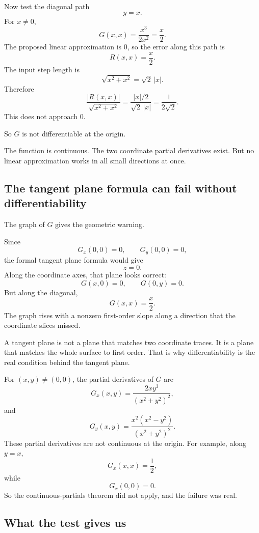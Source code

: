 Now test the diagonal path
\[
    y=x.
\]
For \(x\ne0\),
\[
    G(x,x)=
    \frac{x^3}{2x^2}
    =
    \frac{x}{2}.
\]
The proposed linear approximation is \(0\), so the error along this path is
\[
    R(x,x)=\frac{x}{2}.
\]
The input step length is
\[
    \sqrt{x^2+x^2}=\sqrt2\,|x|.
\]
Therefore
\[
    \frac{|R(x,x)|}{\sqrt{x^2+x^2}}
    =
    \frac{|x|/2}{\sqrt2\,|x|}
    =
    \frac1{2\sqrt2}.
\]
This does not approach \(0\).

So \(G\) is not differentiable at the origin.

The function is continuous.  The two coordinate partial derivatives exist.  But no
linear approximation works in all small directions at once.

\subsection{The tangent plane formula can fail without differentiability}

The graph of \(G\) gives the geometric warning.

Since
\[
    G_x(0,0)=0,
    \qquad
    G_y(0,0)=0,
\]
the formal tangent plane formula would give
\[
    z=0.
\]
Along the coordinate axes, that plane looks correct:
\[
    G(x,0)=0,
    \qquad
    G(0,y)=0.
\]
But along the diagonal,
\[
    G(x,x)=\frac{x}{2}.
\]
The graph rises with a nonzero first-order slope along a direction that the coordinate
slices missed.

A tangent plane is not a plane that matches two coordinate traces.  It is a plane that
matches the whole surface to first order.  That is why differentiability is the real
condition behind the tangent plane.

For \((x,y)\ne(0,0)\), the partial derivatives of \(G\) are
\[
    G_x(x,y)=\frac{2xy^3}{(x^2+y^2)^2},
\]
and
\[
    G_y(x,y)=\frac{x^2(x^2-y^2)}{(x^2+y^2)^2}.
\]
These partial derivatives are not continuous at the origin.  For example, along
\(y=x\),
\[
    G_x(x,x)=\frac12,
\]
while
\[
    G_x(0,0)=0.
\]
So the continuous-partials theorem did not apply, and the failure was real.

\subsection{What the test gives us}

